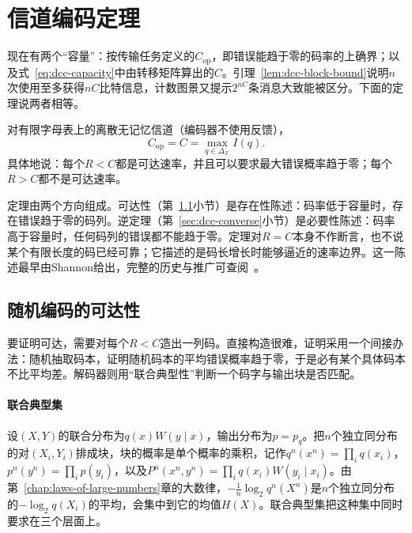 \section{信道编码定理}
\label{sec:dcc-coding-theorem}

现在有两个“容量”：按传输任务定义的$C_{\mathrm{op}}$，即错误能趋于零的码率的上确界；以及式~\eqref{eq:dcc-capacity}中由转移矩阵算出的$C$。引理~\ref{lem:dcc-block-bound}说明$n$次使用至多获得$nC$比特信息，计数图景又提示$2^{nC}$条消息大致能被区分。下面的定理说两者相等。

\begin{theorem}[信道编码定理]
\label{thm:dcc-coding-theorem}
对有限字母表上的离散无记忆信道（编码器不使用反馈），
\begin{equation}
 C_{\mathrm{op}}=C=\max_{q\in\Delta_{\mathcal{X}}}I(q) .
 \label{eq:dcc-coding-theorem}
\end{equation}
具体地说：每个$R<C$都是可达速率，并且可以要求最大错误概率趋于零；每个$R>C$都不是可达速率。
\end{theorem}

定理由两个方向组成。可达性（第~\ref{sec:dcc-achievability}小节）是存在性陈述：码率低于容量时，存在错误趋于零的码列。逆定理（第~\ref{sec:dcc-converse}小节）是必要性陈述：码率高于容量时，任何码列的错误都不能趋于零。定理对$R=C$本身不作断言，也不说某个有限长度的码已经可靠；它描述的是码长增长时能够逼近的速率边界。这一陈述最早由Shannon给出，完整的历史与推广可查阅~。

\subsection{随机编码的可达性}
\label{sec:dcc-achievability}

要证明可达，需要对每个$R<C$造出一列码。直接构造很难，证明采用一个间接办法：随机抽取码本，证明随机码本的平均错误概率趋于零，于是必有某个具体码本不比平均差。解码器则用“联合典型性”判断一个码字与输出块是否匹配。

\paragraph{联合典型集}
设$(X,Y)$的联合分布为$q(x)W(y\mid x)$，输出分布为$p=p_q$。把$n$个独立同分布的对$(X_i,Y_i)$排成块，块的概率是单个概率的乘积，记作$q^n(x^n)=\prod_iq(x_i)$，$p^n(y^n)=\prod_ip(y_i)$，以及$P^n(x^n,y^n)=\prod_iq(x_i)W(y_i\mid x_i)$。由第~\ref{chap:laws-of-large-numbers}章的大数律，$-\frac1n\log_2q^n(X^n)$是$n$个独立同分布的$-\log_2q(X_i)$的平均，会集中到它的均值$H(X)$。联合典型集把这种集中同时要求在三个层面上。

